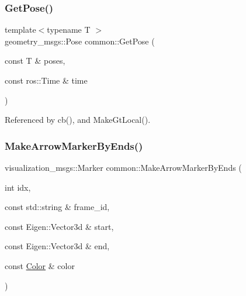 \mbox{\label{namespacecommon_afec20fc02d4e0364825bb7f9dbca7bfc}} 
\subsubsection{\texorpdfstring{Get\+Pose()}{GetPose()}}
{\footnotesize\ttfamily template$<$typename T $>$ \\
geometry\+\_\+msgs\+::\+Pose common\+::\+Get\+Pose (\begin{DoxyParamCaption}\item[{const T \&}]{poses,  }\item[{const ros\+::\+Time \&}]{time }\end{DoxyParamCaption})}



Referenced by cb(), and Make\+Gt\+Local().

\mbox{\label{namespacecommon_ad66202ab90483412f7aca1dbfe5d399f}} 
\subsubsection{\texorpdfstring{Make\+Arrow\+Marker\+By\+Ends()}{MakeArrowMarkerByEnds()}}
{\footnotesize\ttfamily visualization\+\_\+msgs\+::\+Marker common\+::\+Make\+Arrow\+Marker\+By\+Ends (\begin{DoxyParamCaption}\item[{int}]{idx,  }\item[{const std\+::string \&}]{frame\+\_\+id,  }\item[{const Eigen\+::\+Vector3d \&}]{start,  }\item[{const Eigen\+::\+Vector3d \&}]{end,  }\item[{const \hyperlink{namespacecommon_a325f61d2a1dcd20782fbb1421c0c3631}{Color} \&}]{color }\end{DoxyParamCaption})}

\mbox{\label{namespacecommon_a1e46ad350c4ff03cf926cb40667019f9}} 
